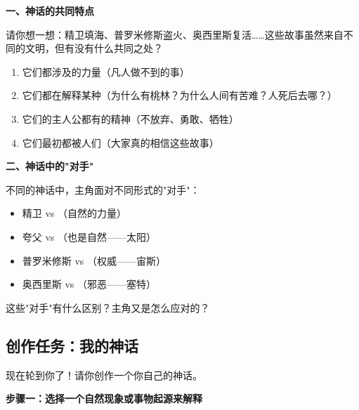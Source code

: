 \documentclass[a4paper,12pt]{ctexart}
\begin{document}
\textbf{一、神话的共同特点}

请你想一想：精卫填海、普罗米修斯盗火、奥西里斯复活……这些故事虽然来自不同的文明，但有没有什么共同之处？

\vspace{0.2cm}
\begin{enumerate}
  \item 它们都涉及\underline{\hspace{4cm}}的力量（凡人做不到的事）
  \item 它们都在解释某种\underline{\hspace{4cm}}（为什么有桃林？为什么人间有苦难？人死后去哪？）
  \item 它们的主人公都有\underline{\hspace{4cm}}的精神（不放弃、勇敢、牺牲）
  \item 它们最初都被人们\underline{\hspace{4cm}}（大家真的相信这些故事）
\end{enumerate}

\vspace{0.5cm}

\textbf{二、神话中的"对手"}

不同的神话中，主角面对不同形式的"对手"：

\begin{itemize}
  \item 精卫 vs \underline{\hspace{3cm}}（自然的力量）
  \item 夸父 vs \underline{\hspace{3cm}}（也是自然——太阳）
  \item 普罗米修斯 vs \underline{\hspace{3cm}}（权威——宙斯）
  \item 奥西里斯 vs \underline{\hspace{3cm}}（邪恶——塞特）
\end{itemize}

这些"对手"有什么区别？主角又是怎么应对的？

\vspace{0.5cm}

\subsection*{\textcolor{teal!80!black}{创作任务：我的神话}}

现在轮到你了！请你创作一个你自己的神话。

\textbf{步骤一：选择一个自然现象或事物起源来解释}
\end{document}
